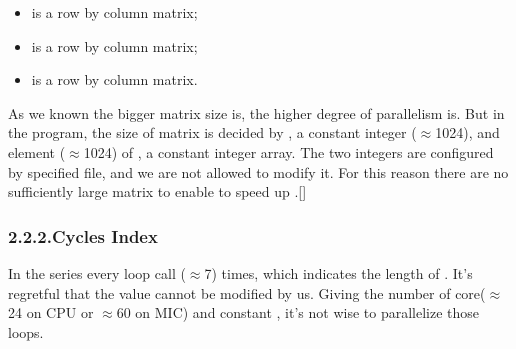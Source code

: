 \documentclass{article}
\begin{document}
\begin{itemize}[noitemsep,topsep=\mdcompacttopsep]%

\item{} is a  row by  column matrix;%

\item{} is a  row by  column matrix;%

\item{} is a  row by  column matrix.%
\end{itemize}%

\noindent{}As we known the bigger matrix size is, the higher degree of  parallelism is. But in the  program, the size of matrix is decided by , a constant integer (\ensuremath{\approx}1024), and element (\ensuremath{\approx}1024) of , a constant integer array. The two integers are configured by specified file, and we are not allowed to modify it. For this reason there are no sufficiently large matrix to enable  to speed up .[]%

\subsubsection{2.2.2.\hspace*{0.5em}Cycles Index}\label{sec-cycles-index}%

\noindent{}In the  series every loop call  (\ensuremath{\approx}7) times, which indicates the length of . It's regretful that the value cannot be modified by us. Giving the number of core(\ensuremath{\approx}24 on CPU or \ensuremath{\approx}60 on MIC) and constant , it's not wise to parallelize those loops.%
\end{document}
